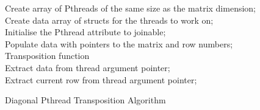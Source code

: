 \documentclass[a4paper,10pt]{article}
\begin{document}
\begin{algorithm}[H]
	\SetAlgoLined
	Create array of Pthreads of the same size as the matrix dimension;\\
	Create data array of structs for the threads to work on;\\
	Initialise the 	Pthread attribute to joinable;\\
	Populate data with pointers to the matrix and row numbers;\\
\vspace{0.5cm}
	Transposition function\\
	Extract data from thread argument pointer;\\
	Extract current row from thread argument pointer;\\
	
	
	\caption{Diagonal Pthread Transposition Algorithm}
\end{algorithm}
\end{document}
